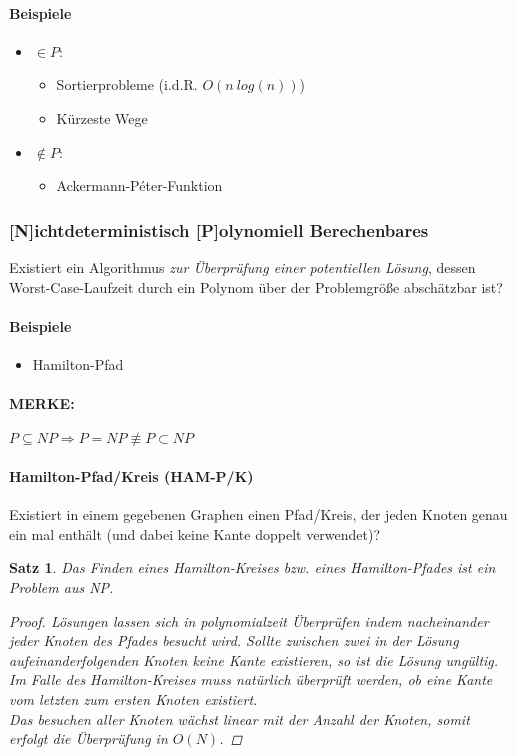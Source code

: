 \documentclass{article}
\begin{document}
\paragraph*{Beispiele}
\begin{itemize}
    \item $\in P$:
          \begin{itemize}
              \item Sortierprobleme (i.d.R. $O(n\:log(n))$)
              \item Kürzeste Wege
          \end{itemize}
    \item $\notin P$:
          \begin{itemize}
              \item Ackermann-P\'eter-Funktion
          \end{itemize}
\end{itemize}
\subsubsection{[N]ichtdeterministisch [P]olynomiell Berechenbares}
Existiert ein Algorithmus \emph{zur Überprüfung einer potentiellen Lösung}, dessen Worst-Case-Laufzeit durch ein Polynom über der Problemgröße abschätzbar ist?
\paragraph*{Beispiele}
\begin{itemize}
    \item Hamilton-Pfad
\end{itemize}
\paragraph*{MERKE:}
$P \subseteq NP \Rightarrow P = NP\not\equiv P \subset NP$
\paragraph*{Hamilton-Pfad/Kreis (HAM-P/K)}
Existiert in einem gegebenen Graphen einen Pfad/Kreis, der jeden Knoten genau ein mal enthält (und dabei keine Kante doppelt verwendet)?
\newtheorem{hamiltonnp}{Satz}
\begin{framed}
    \begin{hamiltonnp}
        Das Finden eines Hamilton-Kreises bzw. eines Hamilton-Pfades ist ein Problem aus NP. 
        \begin{proof}
            Lösungen lassen sich in polynomialzeit Überprüfen indem nacheinander jeder Knoten des Pfades besucht wird. Sollte zwischen zwei in der Lösung aufeinanderfolgenden Knoten keine Kante existieren, so ist die Lösung ungültig. Im Falle des Hamilton-Kreises muss natürlich überprüft werden, ob eine Kante vom letzten zum ersten Knoten existiert.\\
            Das besuchen aller Knoten wächst linear mit der Anzahl der Knoten, somit erfolgt die Überprüfung in $O(N)$.
        \end{proof}
    \end{hamiltonnp}
\end{framed}
\end{document}

